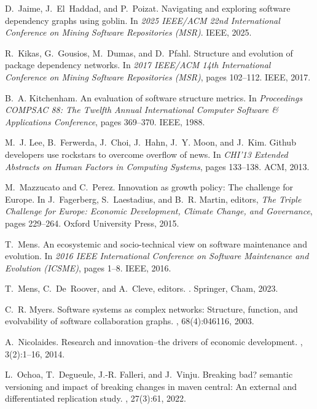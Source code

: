 \documentclass[10pt,conference]{IEEEtran}
\begin{document}
\begin{thebibliography}{10}
D.~Jaime, J.~El~Haddad, and P.~Poizat.
\newblock Navigating and exploring software dependency graphs using goblin.
\newblock In {\em 2025 IEEE/ACM 22nd International Conference on Mining
  Software Repositories (MSR)}. IEEE, 2025.

R.~Kikas, G.~Gousios, M.~Dumas, and D.~Pfahl.
\newblock Structure and evolution of package dependency networks.
\newblock In {\em 2017 IEEE/ACM 14th International Conference on Mining
  Software Repositories (MSR)}, pages 102--112. IEEE, 2017.

B.~A. Kitchenham.
\newblock An evaluation of software structure metrics.
\newblock In {\em Proceedings COMPSAC 88: The Twelfth Annual International
  Computer Software \& Applications Conference}, pages 369--370. IEEE, 1988.

M.~J. Lee, B.~Ferwerda, J.~Choi, J.~Hahn, J.~Y. Moon, and J.~Kim.
\newblock Github developers use rockstars to overcome overflow of news.
\newblock In {\em CHI'13 Extended Abstracts on Human Factors in Computing
  Systems}, pages 133--138. ACM, 2013.

M.~Mazzucato and C.~Perez.
\newblock Innovation as growth policy: The challenge for {Europe}.
\newblock In J.~Fagerberg, S.~Laestadius, and B.~R. Martin, editors, {\em The
  Triple Challenge for Europe: Economic Development, Climate Change, and
  Governance}, pages 229--264. Oxford University Press, 2015.

T.~Mens.
\newblock An ecosystemic and socio-technical view on software maintenance and
  evolution.
\newblock In {\em 2016 IEEE International Conference on Software Maintenance
  and Evolution (ICSME)}, pages 1--8. IEEE, 2016.

T.~Mens, C.~De~Roover, and A.~Cleve, editors.
.
\newblock Springer, Cham, 2023.

C.~R. Myers.
\newblock Software systems as complex networks: Structure, function, and
  evolvability of software collaboration graphs.
, 68(4):046116, 2003.

A.~Nicolaides.
\newblock Research and innovation--the drivers of economic development.
,
  3(2):1--16, 2014.

L.~Ochoa, T.~Degueule, J.-R. Falleri, and J.~Vinju.
\newblock Breaking bad? semantic versioning and impact of breaking changes in
  maven central: An external and differentiated replication study.
, 27(3):61, 2022.


\end{thebibliography}
\end{document}
